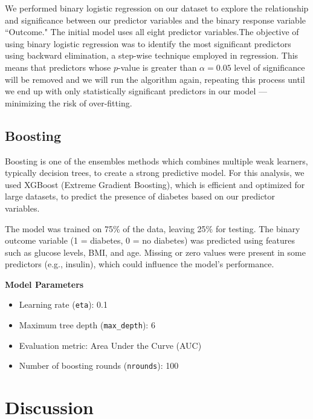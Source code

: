 \documentclass[12pt]{article}
\begin{document}
\begin{indent}
	

We performed binary logistic regression \cite{faraway2016extending} on our dataset to explore the relationship and significance between our predictor variables and the binary response variable “Outcome." The initial model uses all eight predictor variables.The objective of using binary logistic regression was to identify the most significant predictors using backward elimination, a step-wise technique employed in regression. This means that predictors whose $p$-value is greater than $\alpha = 0.05$ level of significance will be removed and we will run the algorithm again, repeating this process until we end up with only statistically significant predictors in our model --- minimizing the risk of over-fitting. 

\end{indent}

\subsection{Boosting}

Boosting \cite{chen2015xgboost} \cite{friedman2001greedy} is one of the ensembles methods which combines multiple weak learners, typically decision trees, to create a strong predictive model. For this analysis, we used XGBoost (Extreme Gradient Boosting), which is efficient and optimized for large datasets, to predict the presence of diabetes based on our predictor variables.

The model was trained on 75\% of the data, leaving 25\% for testing. The binary outcome variable (1 = diabetes, 0 = no diabetes) was predicted using features such as glucose levels, BMI, and age. Missing or zero values were present in some predictors (e.g., insulin), which could influence the model's performance.

\textbf{Model Parameters}
\begin{itemize}
	\item Learning rate (\texttt{eta}): 0.1
	\item Maximum tree depth (\texttt{max\_depth}): 6
	\item Evaluation metric: Area Under the Curve (AUC)
	\item Number of boosting rounds (\texttt{nrounds}): 100
\end{itemize}

\section{Discussion}
\end{document}
